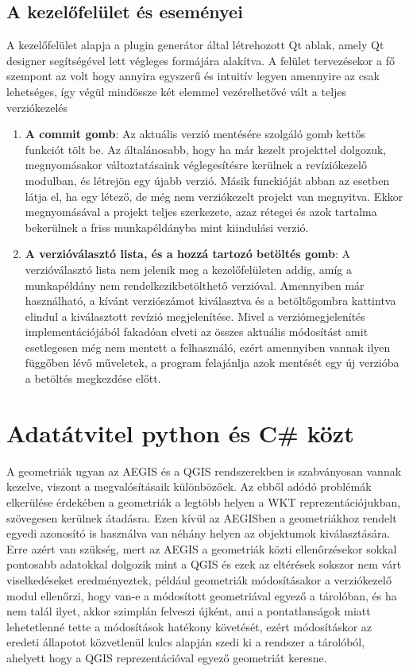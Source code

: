 \subsection{A kezelőfelület és eseményei}
A kezelőfelület alapja a plugin generátor által létrehozott Qt ablak, amely Qt designer segítségével lett végleges formájára alakítva. A felület tervezésekor a fő szempont az volt hogy annyira egyszerű és intuitív legyen amennyire az csak lehetséges, így végül mindössze két elemmel vezérelhetővé vált a teljes verziókezelés
\begin{enumerate}
	\item \textbf{A commit gomb}: Az aktuális verzió mentésére szolgáló gomb kettős funkciót tölt be. Az általánosabb, hogy ha már kezelt projekttel dolgozuk, megnyomásakor változtatásaink véglegesítésre kerülnek a revíziókezelő modulban, és létrejön egy újabb verzió. Másik funckióját abban az esetben látja el, ha egy létező, de még nem verziókezelt projekt van megnyitva. Ekkor megnyomásával a projekt teljes szerkezete, azaz rétegei és azok tartalma bekerülnek a friss munkapéldányba mint kiindulási verzió.
	\item \textbf{A verzióválasztó lista, és a hozzá tartozó betöltés gomb}: A verzióválasztó lista nem jelenik meg a kezelőfelületen addig, amíg a munkapéldány nem rendelkezikbetölthető verzióval. Amennyiben már használható, a kívánt verziószámot kiválasztva és a betöltőgombra kattintva elindul a kiválasztott revízió megjelenítése. Mivel a verziómegjelenítés implementációjából fakadóan elveti az összes aktuális módosítást amit esetlegesen még nem mentett a felhasználó, ezért amennyiben vannak ilyen függőben lévő műveletek, a program felajánlja azok mentését egy új verzióba a betöltés megkezdése előtt.
\end{enumerate}

\section{Adatátvitel python és C\# közt}
A geometriák ugyan az AEGIS és a QGIS rendszerekben is szabványosan vannak kezelve, viszont a megvalósításaik különbözőek. Az ebből adódó problémák elkerülése érdekében a geometriák a legtöbb helyen a WKT reprezentációjukban, szövegesen kerülnek átadásra. Ezen kívül az AEGISben a geometriákhoz rendelt egyedi azonosító is használva van néhány helyen az objektumok kiválasztására. Erre azért van szükség, mert az AEGIS a geometriák közti ellenőrzésekor sokkal pontosabb adatokkal dolgozik mint a QGIS és ezek az eltérések sokszor nem várt viselkedéseket eredményeztek, például geometriák módosításakor a verziókezelő modul ellenőrzi, hogy van-e a módosított geometriával egyező a tárolóban, és ha nem talál ilyet, akkor szimplán felveszi újként, ami a pontatlanságok miatt lehetetlenné tette a módosítások hatékony követését, ezért módosításkor az eredeti állapotot közvetlenül kulcs alapján szedi ki a rendszer a tárolóból, ahelyett hogy a QGIS reprezentációval egyező geometriát keresne.

